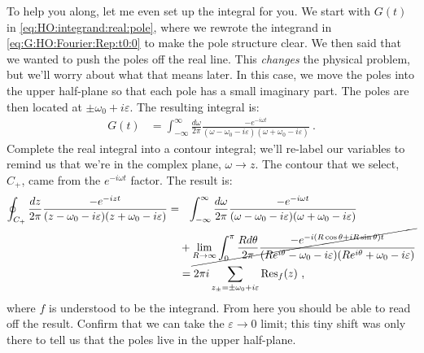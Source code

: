 To help you along, let me even set up the integral for you. We start with $G(t)$ in \eqref{eq:HO:integrand:real:pole}, where we rewrote the integrand in \eqref{eq:G:HO:Fourier:Rep:t0:0} to make the pole structure clear. We then said that we wanted to push the poles off the real line. This \emph{changes} the physical problem, but we'll worry about what that means later. In this case, we move the poles into the upper half-plane so that each pole has a small imaginary part. The poles are then located at $\pm \omega_0 + i \varepsilon$. The resulting integral is:
\begin{align}
	G(t) &= 
	\int_{-\infty}^\infty \frac{d\omega}{2\pi} 
	\frac{-e^{-i\omega t}}{(\omega - \omega_0-i\varepsilon)(\omega + \omega_0-i\varepsilon)} 
	\ .
\end{align}
Complete the real integral into a contour integral; we'll re-label our variables to remind us that we're in the complex plane, $\omega\to z$. The contour that we select, $C_+$, came from the $e^{-i\omega t}$ factor. The result is:
\begin{align}
	\oint_{C_+}
	\frac{dz}{2\pi} 
	\frac{-e^{-iz t}}{(z - \omega_0-i\varepsilon)(z + \omega_0-i\varepsilon)}
	=&\phantom{+} 
	\int_{-\infty}^\infty \frac{d\omega}{2\pi} 
	\frac{-e^{-i\omega t}}{(\omega - \omega_0-i\varepsilon)(\omega + \omega_0-i\varepsilon)} 
	\nonumber
	\\
	&
	+ 
	\cancel{
	\lim_{R\to\infty} \int_{0}^\pi \frac{Rd\theta}{2\pi} 
	\frac{-e^{-i(R\cos\theta + i R\sin\theta)t}}{(Re^{i\theta} - \omega_0-i\varepsilon)(Re^{i\theta} + \omega_0-i\varepsilon)} 
	}
	\label{eq:HO:G:integral:adv:1}
	\\
	&=
	2\pi i \sum_{z_\pm=\pm\omega_0+i\varepsilon} \text{Res}_f(z) \ ,
	\label{eq:HO:G:integral:adv:2}
\end{align}
where $f$ is understood to be the integrand. 
%
From here you should be able to read off the result. Confirm that we can take the $\varepsilon\to 0$ limit; this tiny shift was only there to tell us that the poles live in the upper half-plane.

